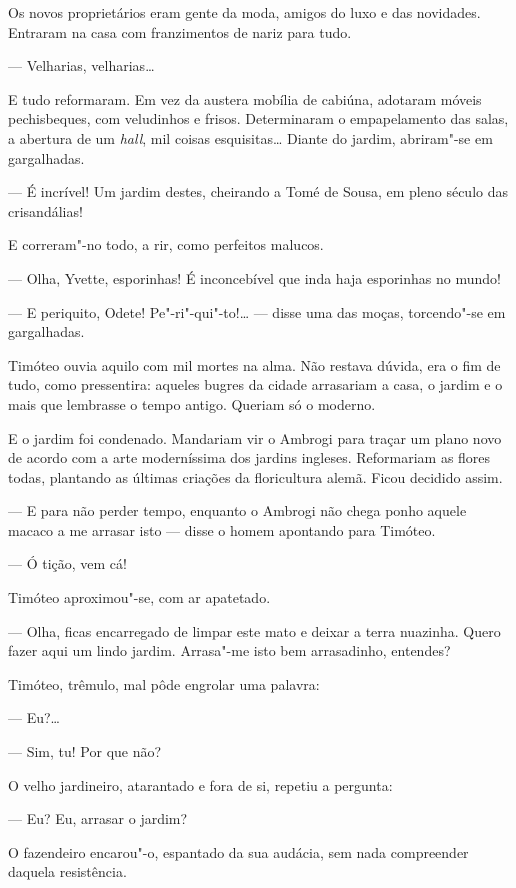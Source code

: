 Os novos proprietários eram gente da moda, amigos do luxo e das
novidades. Entraram na casa com franzimentos de nariz para tudo.

--- Velharias, velharias\ldots{}

E tudo reformaram. Em vez da austera mobília de cabiúna, adotaram móveis
pechisbeques, com veludinhos e frisos. Determinaram o empapelamento das
salas, a abertura de um \emph{hall}, mil coisas esquisitas\ldots{} Diante do
jardim, abriram"-se em gargalhadas.

--- É incrível! Um jardim destes, cheirando a Tomé de Sousa, em pleno
século das crisandálias!

E correram"-no todo, a rir, como perfeitos malucos.

--- Olha, Yvette, esporinhas! É inconcebível que inda haja esporinhas no
mundo!

--- E periquito, Odete! Pe"-ri"-qui"-to!\ldots{} --- disse uma das moças,
torcendo"-se em gargalhadas.

Timóteo ouvia aquilo com mil mortes na alma. Não restava dúvida, era o
fim de tudo, como pressentira: aqueles bugres da cidade arrasariam a
casa, o jardim e o mais que lembrasse o tempo antigo. Queriam só o
moderno.

E o jardim foi condenado. Mandariam vir o Ambrogi para traçar um plano
novo de acordo com a arte moderníssima dos jardins ingleses. Reformariam
as flores todas, plantando as últimas criações da floricultura alemã.
Ficou decidido assim.

--- E para não perder tempo, enquanto o Ambrogi não chega ponho aquele
macaco a me arrasar isto --- disse o homem apontando para Timóteo.

--- Ó tição, vem cá!

Timóteo aproximou"-se, com ar apatetado.

--- Olha, ficas encarregado de limpar este mato e deixar a terra
nuazinha. Quero fazer aqui um lindo jardim. Arrasa"-me isto bem
arrasadinho, entendes?

Timóteo, trêmulo, mal pôde engrolar uma palavra:

--- Eu?\ldots{}

--- Sim, tu! Por que não?

O velho jardineiro, atarantado e fora de si, repetiu a pergunta:

--- Eu? Eu, arrasar o jardim?

O fazendeiro encarou"-o, espantado da sua audácia, sem nada compreender
daquela resistência.

